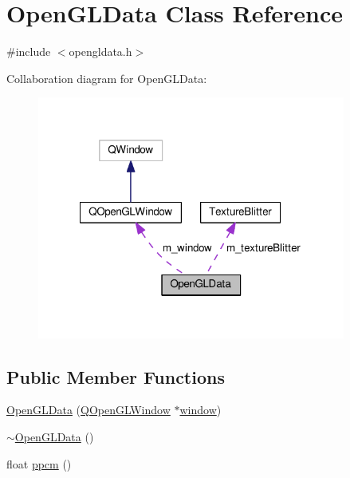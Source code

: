 \hypertarget{classOpenGLData}{\section{Open\-G\-L\-Data Class Reference}
\label{classOpenGLData}
}


{\ttfamily \#include $<$opengldata.\-h$>$}



Collaboration diagram for Open\-G\-L\-Data\-:
\nopagebreak
\begin{figure}[H]
\begin{center}
\leavevmode
\includegraphics[width=287pt]{classOpenGLData__coll__graph}
\end{center}
\end{figure}
\subsection*{Public Member Functions}
\begin{DoxyCompactItemize}
\item 
\hyperlink{classOpenGLData_ae45b74d0a593e043189b8118e6abcb23}{Open\-G\-L\-Data} (\hyperlink{classQOpenGLWindow}{Q\-Open\-G\-L\-Window} $\ast$\hyperlink{structwindow}{window})
\item 
\hyperlink{classOpenGLData_a9241741339383a555a7189f472006a22}{$\sim$\-Open\-G\-L\-Data} ()
\item 
float \hyperlink{classOpenGLData_a8345c6c7bb79a3e48dfea00b786525c7}{ppcm} ()
\end{DoxyCompactItemize}
